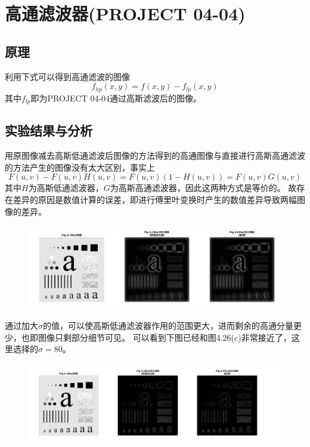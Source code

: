 \documentclass[logo,reportComp]{thesis}
\begin{document}
\section{高通滤波器(PROJECT 04-04)}
\subsection{原理}
利用下式可以得到高通滤波的图像
\[f_{hp}(x,y)=f(x,y)-f_{lp}(x,y)\]
其中$f_{lp}$即为PROJECT 04-04通过高斯滤波后的图像。

\subsection{实验结果与分析}
用原图像减去高斯低通滤波后图像的方法得到的高通图像与直接进行高斯高通滤波的方法产生的图像没有太大区别，事实上
\[F(u,v)-F(u,v)H(u,v)=F(u,v)(1-H(u,v))=F(u,v)G(u,v)\]
其中$H$为高斯低通滤波器，$G$为高斯高通滤波器，因此这两种方式是等价的。
故存在差异的原因是数值计算的误差，即进行傅里叶变换时产生的数值差异导致两幅图像的差异。
\begin{figure}[H]
\centering
\includegraphics[width=0.8\linewidth]{fig/03.png}
\end{figure}

通过加大$\sigma$的值，可以使高斯低通滤波器作用的范围更大，进而剩余的高通分量更少，也即图像只剩部分细节可见。
可以看到下图已经和图4.26(c)非常接近了，这里选择的$\sigma=80$。
\begin{figure}[H]
\centering
\includegraphics[width=0.9\linewidth]{fig/04.png}
\end{figure}
\end{document}
